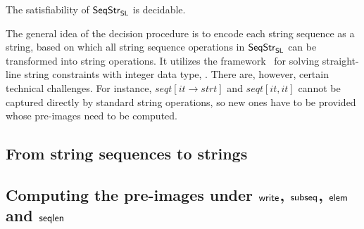

\begin{theorem}\label{thm-main}
	The satisfiability of ${\sf SeqStr}_{\sf SL}$ is decidable.
\end{theorem}

The general idea of the decision procedure is to encode each string sequence as a string, based on which all string sequence operations in ${\sf SeqStr}_{\sf SL}$ can be transformed into string operations. %
It utilizes the framework~\cite{atva2020} for solving straight-line string constraints with integer data type,  . There are, however, certain technical challenges. For instance, %
$seqt[it \rightarrow strt]$ and $seqt[it, it]$ cannot be captured directly by standard string operations,  
so new ones have to be provided whose pre-images need to be computed. %
%

\subsection{From string sequences to strings}\label{subsect:seq2string}



\subsection{Computing the pre-images under $\mathsf{write}$, ${\sf subseq}$, ${\sf elem}$ and $\mathsf{seqlen}$} \label{subsect:preimage}



